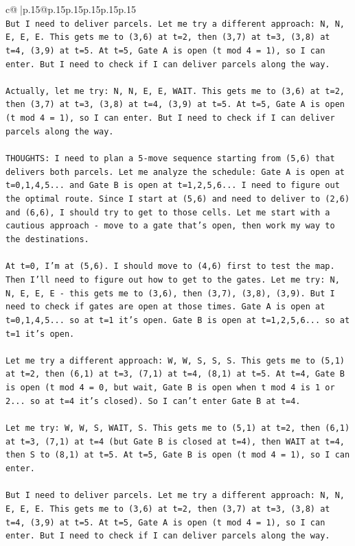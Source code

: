 \documentclass{article}
\begin{document}
{\begin{supertabular}{c@{$\;$}|p{.15\linewidth}@{}p{.15\linewidth}p{.15\linewidth}p{.15\linewidth}p{.15\linewidth}p{.15\linewidth}}
{{{\\ 
\texttt{But I need to deliver parcels. Let me try a different approach: N, N, E, E, E. This gets me to (3,6) at t=2, then (3,7) at t=3, (3,8) at t=4, (3,9) at t=5. At t=5, Gate A is open (t mod 4 = 1), so I can enter. But I need to check if I can deliver parcels along the way.} \\
\\ 
\texttt{Actually, let me try: N, N, E, E, WAIT. This gets me to (3,6) at t=2, then (3,7) at t=3, (3,8) at t=4, (3,9) at t=5. At t=5, Gate A is open (t mod 4 = 1), so I can enter. But I need to check if I can deliver parcels along the way.} \\
\\ 
\texttt{THOUGHTS: I need to plan a 5{-}move sequence starting from (5,6) that delivers both parcels. Let me analyze the schedule: Gate A is open at t=0,1,4,5... and Gate B is open at t=1,2,5,6... I need to figure out the optimal route. Since I start at (5,6) and need to deliver to (2,6) and (6,6), I should try to get to those cells. Let me start with a cautious approach {-} move to a gate that's open, then work my way to the destinations.} \\
\\ 
\texttt{At t=0, I'm at (5,6). I should move to (4,6) first to test the map. Then I'll need to figure out how to get to the gates. Let me try: N, N, E, E, E {-} this gets me to (3,6), then (3,7), (3,8), (3,9). But I need to check if gates are open at those times. Gate A is open at t=0,1,4,5... so at t=1 it's open. Gate B is open at t=1,2,5,6... so at t=1 it's open.} \\
\\ 
\texttt{Let me try a different approach: W, W, S, S, S. This gets me to (5,1) at t=2, then (6,1) at t=3, (7,1) at t=4, (8,1) at t=5. At t=4, Gate B is open (t mod 4 = 0, but wait, Gate B is open when t mod 4 is 1 or 2... so at t=4 it's closed). So I can't enter Gate B at t=4.} \\
\\ 
\texttt{Let me try: W, W, S, WAIT, S. This gets me to (5,1) at t=2, then (6,1) at t=3, (7,1) at t=4 (but Gate B is closed at t=4), then WAIT at t=4, then S to (8,1) at t=5. At t=5, Gate B is open (t mod 4 = 1), so I can enter.} \\
\\ 
\texttt{But I need to deliver parcels. Let me try a different approach: N, N, E, E, E. This gets me to (3,6) at t=2, then (3,7) at t=3, (3,8) at t=4, (3,9) at t=5. At t=5, Gate A is open (t mod 4 = 1), so I can enter. But I need to check if I can deliver parcels along the way.} \\
}}}
\end{supertabular}}
\end{document}

